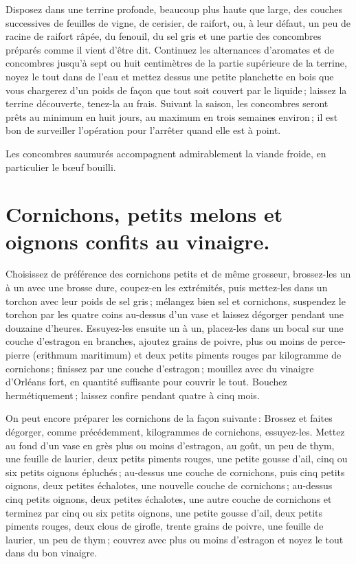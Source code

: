 Disposez dans une terrine profonde, beaucoup plus haute que large, des couches
successives de feuilles de vigne, de cerisier, de raifort, ou, à leur défaut,
un peu de racine de raifort râpée, du fenouil, du sel gris et une partie des
concombres préparés comme il vient d'être dit. Continuez les alternances
d'aromates et de concombres jusqu'à sept ou huit centimètres de la partie
supérieure de la terrine, noyez le tout dans de l'eau et mettez dessus une
petite planchette en bois que vous chargerez d'un poids de façon que tout soit
couvert par le liquide ; laissez la terrine découverte, tenez-la au frais.
Suivant la saison, les concombres seront prêts au minimum en huit jours, au
maximum en trois semaines environ ; il est bon de surveiller l'opération pour
l'arrêter quand elle est à point.

\medskip

Les concombres saumurés accompagnent admirablement la viande froide, en
particulier le bœuf bouilli.

\section*{\centering Cornichons, petits melons et oignons confits au vinaigre.}
{}

Choisissez de préférence des cornichons petits et de même grosseur, brossez-les
un à un avec une brosse dure, coupez-en les extrémités, puis mettez-les dans un
torchon avec leur poids de sel gris ; mélangez bien sel et cornichons,
suspendez le torchon par les quatre coins au-dessus d'un vase et laissez
dégorger pendant une douzaine d'heures. Essuyez-les ensuite un à un, placez-les
dans un bocal sur une couche d'estragon en branches, ajoutez {\mmm}
grains de poivre, plus ou moins de perce-pierre (erithmum maritimum) et deux
petits piments rouges par kilogramme de cornichons ; finissez par une couche
d'estragon ; mouillez avec du vinaigre d'Orléans fort, en quantité suffisante
pour couvrir le tout. Bouchez hermétiquement ; laissez confire pendant quatre
à cinq mois.

\sk

On peut encore préparer les cornichons de la façon suivante : Brossez et faites
dégorger, comme précédemment, {\mmm} kilogrammes de cornichons,
essuyez-les. Mettez au fond d'un vase en grès plus ou moins d’estragon, au
goût, un peu de thym, une feuille de laurier, deux petits piments rouges, une
petite gousse d'ail, cinq ou six petits oignons épluchés ; au-dessus une couche
de cornichons, puis cinq petits oignons, deux petites échalotes, une nouvelle
couche de cornichons ; au-dessus cinq petits oignons, deux petites échalotes,
une autre couche de cornichons et terminez par cinq ou six petits oignons, une
petite gousse d'ail, deux petits piments rouges, deux clous de girofle, trente
grains de poivre, une feuille de laurier, un peu de thym ; couvrez avec plus ou
moins d'estragon et noyez le tout dans du bon vinaigre.

